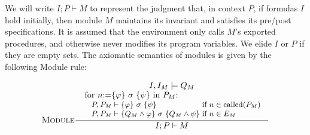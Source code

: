 




We will write $I;P \vdash M$ to represent the judgment
that, in context $P$, if formulas $I$ hold initially, then module $M$
maintains its invariant and satisfies its pre/post specifications. It is assumed that the environment only calls $M$'s exported procedures, and otherwise never modifies its program variables. We elide $I$ or $P$ if they are empty sets.
The axiomatic semantics of modules is given by the following Module rule:


\begin{small}
\[\arraycolsep=1.4pt{\irule{Module}\inference{ I,I_M \models \modinvar_M\\
    \mbox{for $n \Asgn \{ \phi \} \ \sigma\ \{ \psi \}$ in $P_M$:}\quad\quad\quad\quad\quad\quad\quad\quad\quad\,\,\,\,\\
    {\quad\begin{small}\begin{array}{ll}
        P,P_M \vdash \{ \phi \} \ \sigma \ \{ \psi \} & \mbox{if $n \in \Called(P_M)$} \\
        P,P_M \vdash \{ \modinvar_M \wedge \phi \} \  \sigma\  \{ \modinvar_M \wedge \psi \} & \mbox{if $n \in E_M$}
  \end{array}\end{small}}}
  { I;P \vdash M }}\]
\end{small}

